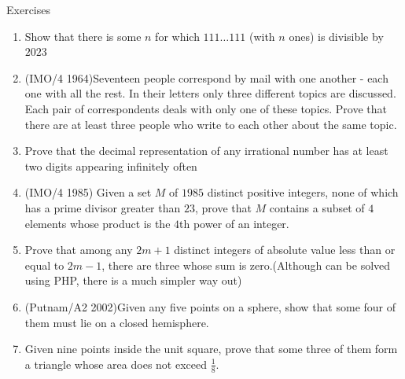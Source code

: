 \begin{xcb}{Exercises}
\begin{enumerate}
\item Show that there is some $n$ for which $111 \dots 111$ (with $n$ ones) is divisible by $2023$
\item (IMO/4 1964)Seventeen people correspond by mail with one another - each one with all the rest. In their letters only three different topics are discussed. Each pair of correspondents deals with only one of these topics. Prove that there are at least three people who write to each other about the same topic.
\item Prove that the decimal representation of any irrational number has at least two digits appearing
infinitely often
\item (IMO/4 1985) Given a set $M$ of $1985$ distinct positive integers, none of which has a prime divisor greater than $23$, prove that $M$ contains a subset of $4$ elements whose product is the $4$th power of an integer.
\item  Prove that among any $2m + 1$ distinct integers of absolute value less than or equal to $2m - 1$, there are three whose sum is zero.(Although can be solved using PHP, there is a much simpler way out)
\item (Putnam/A2 2002)Given any five points on a sphere, show that some four of them must lie on a closed hemisphere.
\item  Given nine points inside the unit square, prove that some three of them form a triangle whose area does not exceed $\frac{1}{8}$.
    \end{enumerate}
\end{xcb}